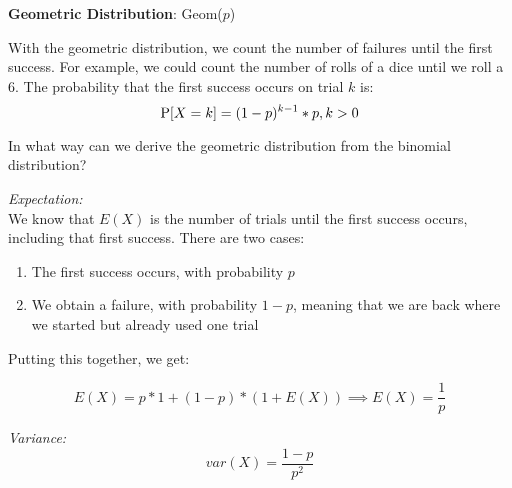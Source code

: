 \vspace{2 mm}
\textbf{Geometric Distribution}: Geom($p$)

With the geometric distribution, we count the number of failures until the first success. For example, we could count the number of rolls of a dice until we roll a 6. The probability that the first success occurs on trial $k$ is:
\[ \P[X = k] = (1 - p)^{k - 1}*p, k > 0\]

In what way can we derive the geometric distribution from the binomial distribution?

\textit{Expectation:} \\
We know that $E(X)$ is the number of trials until the first success occurs, including that first success. There are two cases:
\begin{enumerate}
	\item{The first success occurs, with probability $p$}
	\item{We obtain a failure, with probability $1-p$, meaning that we are back where we started but already used one trial}
\end{enumerate}

Putting this together, we get:

$$E(X) = p * 1 + (1-p) * (1 + E(X)) \implies E(X) = \frac{1}{p}$$

\textit{Variance:} \\
$$var(X) = \frac{1-p}{p^2}$$
